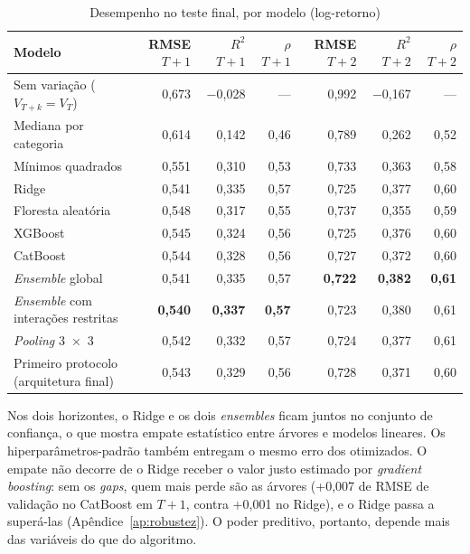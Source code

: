 \documentclass[article, 12pt, oneside, a4paper, english, brazil, section=TITLE]{abntex2}
\begin{document}
\begin{table}[htbp]
  \caption{Desempenho no teste final, por modelo (log-retorno)}
  \label{tab:teste}
  \begin{tabularx}{\textwidth}{Lrrrrrr}
    \toprule
    Modelo & RMSE $T+1$ & $R^2$ $T+1$ & $\rho$ $T+1$ & RMSE $T+2$ & $R^2$ $T+2$ & $\rho$ $T+2$ \\
    \midrule
    Sem variação ($V_{T+k} = V_T$) & 0,673 & −0,028 & — & 0,992 & −0,167 & — \\
    Mediana por categoria & 0,614 & 0,142 & 0,46 & 0,789 & 0,262 & 0,52 \\
    Mínimos quadrados & 0,551 & 0,310 & 0,53 & 0,733 & 0,363 & 0,58 \\
    Ridge & 0,541 & 0,335 & 0,57 & 0,725 & 0,377 & 0,60 \\
    Floresta aleatória & 0,548 & 0,317 & 0,55 & 0,737 & 0,355 & 0,59 \\
    XGBoost & 0,545 & 0,324 & 0,56 & 0,725 & 0,376 & 0,60 \\
    CatBoost & 0,544 & 0,328 & 0,56 & 0,727 & 0,372 & 0,60 \\
    \textit{Ensemble} global & 0,541 & 0,335 & 0,57 & \textbf{0,722} & \textbf{0,382} & \textbf{0,61} \\
    \textit{Ensemble} com interações restritas & \textbf{0,540} & \textbf{0,337} & \textbf{0,57} & 0,723 & 0,380 & 0,61 \\
    \textit{Pooling} 3~×~3 & 0,542 & 0,332 & 0,57 & 0,724 & 0,377 & 0,61 \\
    \midrule
    Primeiro protocolo (arquitetura final) & 0,543 & 0,329 & 0,56 & 0,728 & 0,371 & 0,60 \\
    \bottomrule
  \end{tabularx}
\end{table}

Nos dois horizontes, o Ridge e os dois \textit{ensembles} ficam juntos no conjunto de confiança, o que mostra empate estatístico entre árvores e modelos lineares.
Os hiperparâmetros-padrão também entregam o mesmo erro dos otimizados.
O empate não decorre de o Ridge receber o valor justo estimado por \textit{gradient boosting}: sem os \textit{gaps}, quem mais perde são as árvores (+0,007 de RMSE de validação no CatBoost em $T+1$, contra +0,001 no Ridge), e o Ridge passa a superá-las (Apêndice~\ref{ap:robustez}).
O poder preditivo, portanto, depende mais das variáveis do que do algoritmo.
\end{document}
